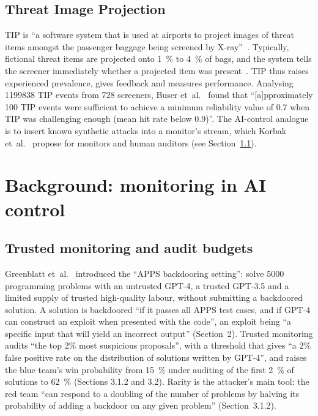 \documentclass[11pt]{article}
\begin{document}
\subsection{Threat Image Projection}\label{sec:tip}

TIP is ``a software system that is used at airports to project images of threat items amongst the passenger baggage being screened by X-ray''~\cite[Abstract]{cutler2009}. Typically, fictional threat items are projected onto \SI{1}{\percent} to \SI{4}{\percent} of bags, and the system tells the screener immediately whether a projected item was present~\cite[Sec.~2]{buser2025}. TIP thus raises experienced prevalence, gives feedback and measures performance. Analysing \num{1199838} TIP events from 728 screeners, Buser et~al.~\cite[Abstract]{buser2025} found that ``[a]pproximately 100 TIP events were sufficient to achieve a minimum reliability value of 0.7 when TIP was challenging enough (mean hit rate below 0.9)''. The AI-control analogue is to insert known synthetic attacks into a monitor's stream, which Korbak et~al.~\cite{korbak2025} propose for monitors and human auditors (see Section~\ref{sec:trusted}).

\section{Background: monitoring in AI control}\label{sec:background-control}

\subsection{Trusted monitoring and audit budgets}\label{sec:trusted}

Greenblatt et~al.~\cite{greenblatt2024} introduced the ``APPS backdooring setting'': solve \num{5000} programming problems with an untrusted GPT-4, a trusted GPT-3.5 and a limited supply of trusted high-quality labour, without submitting a backdoored solution. A solution is backdoored ``if it passes all APPS test cases, and if GPT-4 can construct an exploit when presented with the code'', an exploit being ``a specific input that will yield an incorrect output'' (Section~2). Trusted monitoring audits ``the top 2\% most suspicious proposals'', with a threshold that gives ``a 2\% false positive rate on the distribution of solutions written by GPT-4'', and raises the blue team's win probability from \SI{15}{\percent} under auditing of the first \SI{2}{\percent} of solutions to \SI{62}{\percent} (Sections 3.1.2 and 3.2). Rarity is the attacker's main tool: the red team ``can respond to a doubling of the number of problems by halving its probability of adding a backdoor on any given problem'' (Section~3.1.2).
\end{document}
